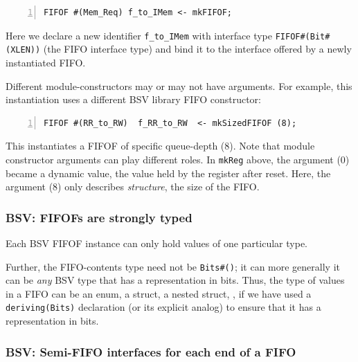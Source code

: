 \begin{Verbatim}[frame=single, numbers=left]
   FIFOF #(Mem_Req) f_to_IMem <- mkFIFOF;
\end{Verbatim}

Here we declare a new identifier \verb|f_to_IMem| with interface type
\verb|FIFOF#(Bit#(XLEN))| (the FIFO interface type) and bind it to the
interface offered by a newly instantiated FIFO.

Different module-constructors may or may not have arguments.  For
example, this instantiation uses a different BSV library FIFO
constructor:


\begin{Verbatim}[frame=single, numbers=left]
   FIFOF #(RR_to_RW)  f_RR_to_RW  <- mkSizedFIFOF (8);
\end{Verbatim}

This instantiates a FIFOF of specific queue-depth (8).  Note that
module constructor arguments can play different roles.  In
\verb|mkReg| above, the argument (0) became a dynamic value, the value
held by the register after reset.  Here, the argument (8) only
describes \emph{structure}, {\ie} the size of the FIFO.


\subsubsection{BSV: FIFOFs are strongly typed}


Each BSV FIFOF instance can only hold values of one particular type.

Further, the FIFO-contents type need not be \verb|Bits#()|; it can
more generally it can be \emph{any} BSV type that has a representation
in bits.  Thus, the type of values in a FIFO can be an enum, a struct,
a nested struct, {\etc}, if we have used a \verb|deriving(Bits)|
declaration (or its explicit analog) to ensure that it has a
representation in bits.


\subsubsection{BSV: Semi-FIFO interfaces for each end of a FIFO}

